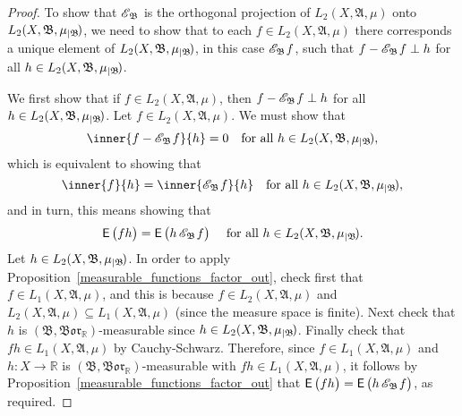 \documentclass[
twoside=true,
paper=letter,
fontsize=11pt,
pagesize=auto,
leqno,
openany,
headsepline,
overfullrule,
]{scrbook}
\theoremstyle{plain}
\theoremstyle{plain}
\theoremstyle{definition}
\theoremstyle{bfnoteitalic}
\theoremstyle{bfnoteroman}
\newcommand{\sigalg}[1]{\mathfrak{#1}}
\newcommand{\cali}[1]{\mathscr{#1}}
\newcommand{\sfop}[1]{\mathsf{#1}}
\newcommand{\expval}{\sfop{E}\,}
\newcommand{\expvalof}[1]{\expval\bigl(#1\bigr)}
\newcommand{\condexpsub}[2]
{\mathop{\cali{E}\hspace{-1.5pt}}\nolimits_{#2}\hspace{-1pt}#1}
\newcommand{\condexpop}[1]{\mathop{\cali{E}\hspace{-1pt}}\nolimits_{#1}}
\newcommand{\borel}{\mathfrak{Bor}}
\newcommand{\restrictedto}[1]{_{\lvert#1}\kern-1.5pt}
\newcommand{\R}{\mathbb{R}}
\newcommand{\sigmaalgebra}{\sigalg{A}}
\newcommand{\sigmaalgebraii}{\sigalg{B}}
\newcommand{\function}{f}
\newcommand{\functioniii}{h}
\newcommand{\measurespace}{X}
\newcommand{\measure}{\mu}
\begin{document}
\begin{proof}
To show that $\condexpop{\sigmaalgebraii}$ is the orthogonal projection of
$L_2(\measurespace, \sigmaalgebra,\measure)$
onto
$L_2(\measurespace, \sigmaalgebraii,\measure\restrictedto{\sigmaalgebraii})$, we need to show that to each $\function\in L_2(\measurespace, \sigmaalgebra,\measure)$ there corresponds a unique element of 
$L_2(\measurespace, \sigmaalgebraii,\measure\restrictedto{\sigmaalgebraii})$, in this case 
$\condexpsub{\function}{\sigmaalgebraii}$, 
such that 
$\function - \condexpsub{\function}{\sigmaalgebraii} \perp \functioniii$ for all $\functioniii\in
L_2(\measurespace, \sigmaalgebraii,\measure\restrictedto{\sigmaalgebraii})$.


We first show that if 
$\function\in L_2(\measurespace, \sigmaalgebra,\measure)$, 
then
$\function - \condexpsub{\function}{\sigmaalgebraii} \perp \functioniii$ for all $\functioniii\in
L_2(\measurespace, \sigmaalgebraii,\measure\restrictedto{\sigmaalgebraii})$.
Let 
$\function \in L_2(\measurespace, \sigmaalgebra,\measure)$.
We must show that  
\[
\inner{\function - \condexpsub{\function}{\sigmaalgebraii}}{\functioniii}=0
\quad
\text{for all 
$\functioniii\in L_2(\measurespace, \sigmaalgebraii,\measure\restrictedto{\sigmaalgebraii})$},
\] 
which is equivalent to showing that 
\[
\inner{\function}{\functioniii} = \inner{\condexpsub{\function}{\sigmaalgebraii}}{\functioniii}
\quad
\text{for all 
$\functioniii\in L_2(\measurespace, \sigmaalgebraii,\measure\restrictedto{\sigmaalgebraii})$},
\] 
and in turn, this means showing that
\[
\expvalof{\function\functioniii} = \expvalof{\functioniii \condexpsub{\function}{\sigmaalgebraii}}
\quad
\text{
for all 
$\functioniii\in L_2(\measurespace, \sigmaalgebraii,\measure\restrictedto{\sigmaalgebraii})$}.
\]  
Let $\functioniii\in L_2(\measurespace, \sigmaalgebraii,\measure\restrictedto{\sigmaalgebraii})$.
In order to apply Proposition~\ref{measurable_functions_factor_out}, 
check first that
$\function \in L_1(\measurespace, \sigmaalgebra,\measure)$, and this is because
$\function \in L_2(\measurespace, \sigmaalgebra,\measure)$ and 
$L_2(\measurespace, \sigmaalgebra,\measure) \subseteq
L_1(\measurespace, \sigmaalgebra,\measure)$ (since the measure space is finite).
Next check that
$\functioniii$ is
$(\sigmaalgebraii, \borel_\R)$\hyp{}measurable
since
$\functioniii\in L_2(\measurespace, \sigmaalgebraii,\measure\restrictedto{\sigmaalgebraii})$.
Finally check that $\function\functioniii\in L_1(\measurespace, \sigmaalgebra,\measure)$ by Cauchy-Schwarz.
Therefore, 
since 
$\function \in L_1(\measurespace, \sigmaalgebra,\measure)$ and
$\functioniii:\measurespace\to\R$ is $(\sigmaalgebraii, \borel_\R)$\hyp{}measurable with 
$\function\functioniii\in L_1(\measurespace, \sigmaalgebra,\measure)$, 
it follows by Proposition~\ref{measurable_functions_factor_out} that 
$\expvalof{\function\functioniii} = \expvalof{\functioniii \condexpsub{\function}{\sigmaalgebraii}}$, as required.


\end{proof}
\end{document}

